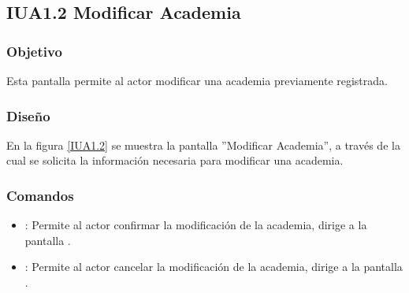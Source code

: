 \subsection{IUA1.2 Modificar Academia}

\subsubsection{Objetivo}
	Esta pantalla permite al actor modificar una academia previamente registrada.

\subsubsection{Diseño}

	En la figura \ref{IUA1.2} se muestra la pantalla ''Modificar Academia'', a través de la cual se solicita la información necesaria para modificar una academia.


\subsubsection{Comandos}
\begin{itemize}
	\item {}: Permite al actor confirmar la modificación de la academia, dirige a la pantalla .
	
	\item {}: Permite al actor cancelar la modificación de la academia, dirige a la pantalla .
\end{itemize}
